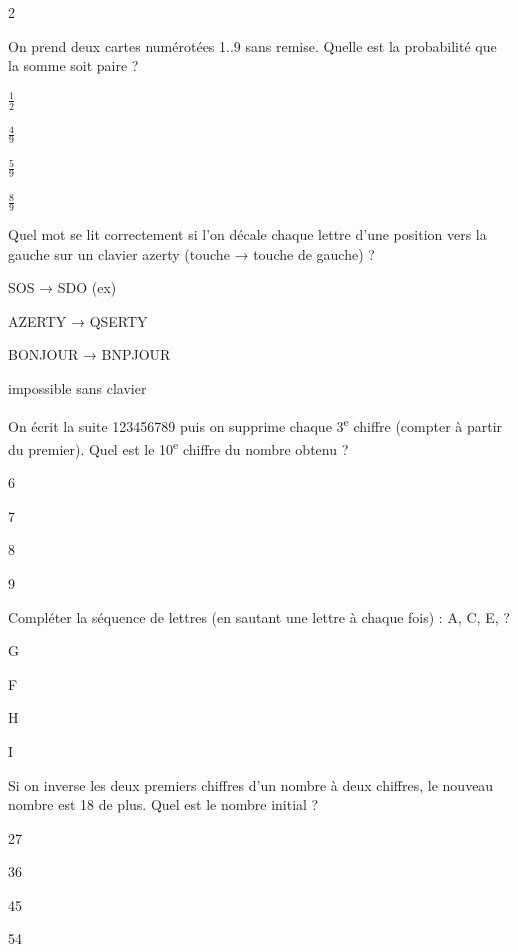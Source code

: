 \begin{multicols}{2}
\begin{question}{}{}
On prend deux cartes numérotées 1..9 sans remise. Quelle est la probabilité que la somme soit paire ?
\begin{enumeratebf}
\item $\frac{1}{2}$
\item $\frac{4}{9}$
\item $\frac{5}{9}$
\item $\frac{8}{9}$
\end{enumeratebf}
\end{question}

\begin{question}{}{}
Quel mot se lit correctement si l’on décale chaque lettre d’une position vers la gauche sur un clavier azerty (touche → touche de gauche) ?
\begin{enumeratebf}
\item SOS → SDO (ex)
\item AZERTY → QSERTY
\item BONJOUR → BNPJOUR
\item impossible sans clavier
\end{enumeratebf}
\end{question}

\begin{question}{}{}
On écrit la suite 123456789 puis on supprime chaque 3\textsuperscript{e} chiffre (compter à partir du premier). Quel est le 10\textsuperscript{e} chiffre du nombre obtenu ?
\begin{enumeratebf}
\item 6
\item 7
\item 8
\item 9
\end{enumeratebf}
\end{question}

\begin{question}{}{}
Compléter la séquence de lettres (en sautant une lettre à chaque fois) : A, C, E, ?
\begin{enumeratebf}
\item G
\item F
\item H
\item I
\end{enumeratebf}
\end{question}

\begin{question}{}{}
Si on inverse les deux premiers chiffres d’un nombre à deux chiffres, le nouveau nombre est 18 de plus. Quel est le nombre initial ?
\begin{enumeratebf}
\item 27
\item 36
\item 45
\item 54
\end{enumeratebf}
\end{question}


\end{multicols}
